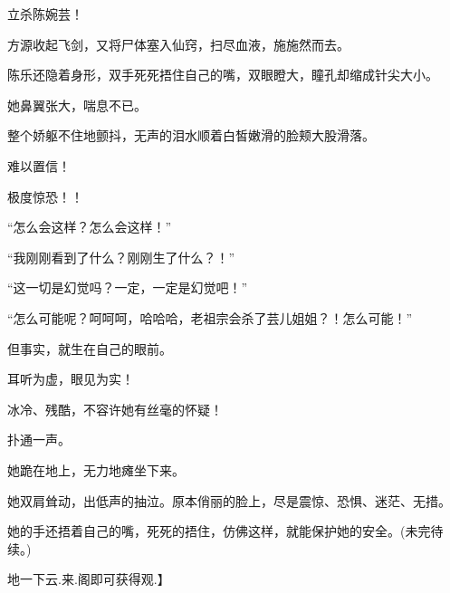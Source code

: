 \begin{this_body}
立杀陈婉芸！

方源收起飞剑，又将尸体塞入仙窍，扫尽血液，施施然而去。

陈乐还隐着身形，双手死死捂住自己的嘴，双眼瞪大，瞳孔却缩成针尖大小。

她鼻翼张大，喘息不已。

整个娇躯不住地颤抖，无声的泪水顺着白皙嫩滑的脸颊大股滑落。

难以置信！

极度惊恐！！

“怎么会这样？怎么会这样！”

“我刚刚看到了什么？刚刚生了什么？！”

“这一切是幻觉吗？一定，一定是幻觉吧！”

“怎么可能呢？呵呵呵，哈哈哈，老祖宗会杀了芸儿姐姐？！怎么可能！”

但事实，就生在自己的眼前。

耳听为虚，眼见为实！

冰冷、残酷，不容许她有丝毫的怀疑！

扑通一声。

她跪在地上，无力地瘫坐下来。

她双肩耸动，出低声的抽泣。原本俏丽的脸上，尽是震惊、恐惧、迷茫、无措。

她的手还捂着自己的嘴，死死的捂住，仿佛这样，就能保护她的安全。(未完待续。)

地一下云.来.阁即可获得观.】

\end{this_body}

